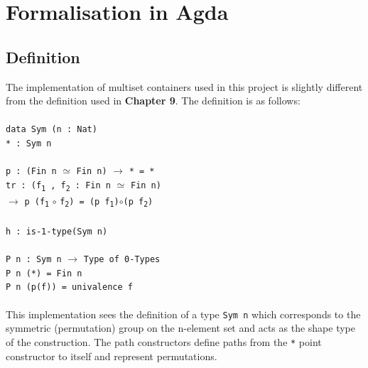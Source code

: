 \documentclass[12pt]{report}
\begin{document}
\chapter{Formalisation in Agda}
\section{Definition}
The implementation of multiset containers used in this project is slightly different from the definition used in \textbf{Chapter 9}. The definition is as follows:\\
\\
\-\hspace{3cm}\texttt{data Sym (n : Nat)}\\
\-\hspace{4cm}\texttt{* : Sym n}\\
\\
\-\hspace{4cm}\texttt{p : (Fin n} $\simeq$ \texttt{Fin n)} $\to$ \texttt{* = *}\\
\-\hspace{4cm}\texttt{tr : (f\textsubscript{1} , f\textsubscript{2} : Fin n} $\simeq$ \texttt{Fin n)}\\
\-\hspace{5.3cm}$\to$ \texttt{p (f\textsubscript{1}} $\circ$ \texttt{f\textsubscript{2}) = (p f\textsubscript{1})}$\circ$\texttt{(p f\textsubscript{2})}\\
\\
\-\hspace{4cm}\texttt{h : is-1-type(Sym n)}\\
\\
\-\hspace{4cm}\texttt{P n : Sym n} $\to$ \texttt{Type of 0-Types}\\
\-\hspace{4cm}\texttt{P n (*) = Fin n}\\
\-\hspace{4cm}\texttt{P n (p(f)) = univalence f}\\
\\
This implementation sees the definition of a type \texttt{Sym n} which corresponds to the symmetric (permutation) group on the n-element set and acts as the shape type of the construction. The path constructors define paths from the \texttt{*} point constructor to itself and represent permutations. 
\newpage
\end{document}
